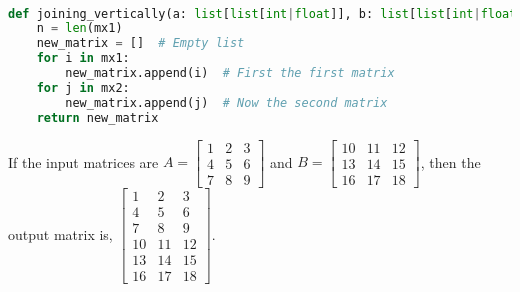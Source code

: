 \begin{explanation}
	\phantom \\
	\begin{lstlisting}[language=Python, numbers=none]
def joining_vertically(a: list[list[int|float]], b: list[list[int|float]]) -> list[list[int|float]]:
    n = len(mx1)
    new_matrix = []  # Empty list
    for i in mx1:
        new_matrix.append(i)  # First the first matrix
    for j in mx2:
        new_matrix.append(j)  # Now the second matrix
    return new_matrix \end{lstlisting}
	If the input matrices are $A=\begin{bmatrix}
			1 & 2 & 3 \\
			4 & 5 & 6 \\
			7 & 8 & 9
		\end{bmatrix}$ and $B=\begin{bmatrix}
			10 & 11 & 12 \\
			13 & 14 & 15 \\
			16 & 17 & 18
		\end{bmatrix}$, then the output matrix is, $\begin{bmatrix}
			1  & 2  & 3  \\
			4  & 5  & 6  \\
			7  & 8  & 9  \\
			10 & 11 & 12 \\
			13 & 14 & 15 \\
			16 & 17 & 18
		\end{bmatrix}$.
\end{explanation}
